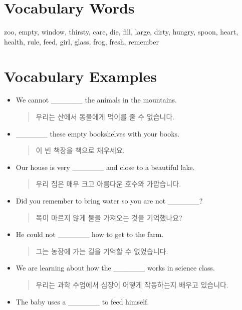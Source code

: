 \documentclass{article}
\begin{document}
\renewcommand{\familydefault}{\sfdefault}
\onehalfspacing
\fontsize{12pt}{14pt}\selectfont

\section*{Vocabulary Words}
\begin{addmargin}[1em]{1em}
zoo, empty, window, thirsty, care, die, fill, large, dirty, hungry, spoon, heart, health, rule, feed, girl, glass, frog, fresh, remember
\end{addmargin}

\section*{Vocabulary Examples}
\begin{addmargin}[1em]{1em}
\begin{itemize}
    \item We cannot \_\_\_\_\_\_ the animals in the mountains.
    \begin{quote}
    우리는 산에서 동물에게 먹이를 줄 수 없습니다.
    \end{quote}
    \item \_\_\_\_\_\_ these empty bookshelves with your books.
    \begin{quote}
    이 빈 책장을 책으로 채우세요.
    \end{quote}
    \item Our house is very \_\_\_\_\_\_ and close to a beautiful lake.
    \begin{quote}
    우리 집은 매우 크고 아름다운 호수와 가깝습니다.
    \end{quote}
    \item Did you remember to bring water so you are not \_\_\_\_\_\_?
    \begin{quote}
    목이 마르지 않게 물을 가져오는 것을 기억했나요?
    \end{quote}
    \item He could not \_\_\_\_\_\_ how to get to the farm.
    \begin{quote}
    그는 농장에 가는 길을 기억할 수 없었습니다.
    \end{quote}
    \item We are learning about how the \_\_\_\_\_\_ works in science class.
    \begin{quote}
    우리는 과학 수업에서 심장이 어떻게 작동하는지 배우고 있습니다.
    \end{quote}
    \item The baby uses a \_\_\_\_\_\_ to feed himself.

\end{itemize}
\end{addmargin}
\end{document}
